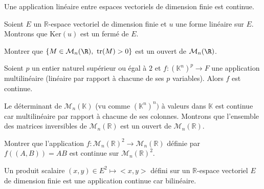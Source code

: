 \documentclass[french,11pt,twoside]{VcCours}
\begin{document}
\begin{Corollaire}{} Une application linéaire entre espaces vectoriels de dimension finie est continue.
\end{Corollaire}

\begin{Exemple} Soient $E$ un $\mathbb{R}$-espace vectoriel de dimension finie et $u$ une forme linéaire sur $E$. Montrons que $\textrm{Ker}(u)$ est un fermé de $E$.

%
%

\vspace*{7cm}
\end{Exemple}

\begin{ApplicationDirecte}{} Montrer que $\{ M\in{\cal M}_n(\R), \ \textrm{tr}(M)>0\}$ est un ouvert de ${\cal M}_n(\R)$.
\end{ApplicationDirecte}


\begin{Theoreme}{} Soient $p$ un entier naturel supérieur ou égal à $2$ et $f : (\mathbb{K}^n)^p \rightarrow F$ une application multilinéaire (linéaire par rapport à chacune de ses $p$ variables). Alors $f$ est continue.
\end{Theoreme}

\begin{Exemple} Le déterminant de $\mathcal{M}_n(\mathbb{K})$ (vu comme $(\mathbb{K}^n)^n)$ à valeurs dans $\mathbb{K}$ est continue car multilinéaire par rapport à chacune de ses colonnes. Montrons que l'ensemble des matrices inversibles de $\mathcal{M}_n(\mathbb{R})$ est un ouvert de $\mathcal{M}_n(\mathbb{R})$.

\vspace*{6cm}
%
\end{Exemple}

\begin{ApplicationDirecte}{} Montrer que l'application $f : \mathcal{M}_n(\mathbb{R})^2 \rightarrow \mathcal{M}_n(\mathbb{R})$ définie par $f((A,B))= AB$ est continue sur $\mathcal{M}_n(\mathbb{R})^2$.
\end{ApplicationDirecte}

\begin{Remarque}{} Un produit scalaire $(x,y) \in E^2 \longmapsto <x,y>$ défini sur un $\mathbb{R}$-espace vectoriel $E$ de dimension finie est une application continue car bilinéaire.
\end{Remarque}
\end{document}

